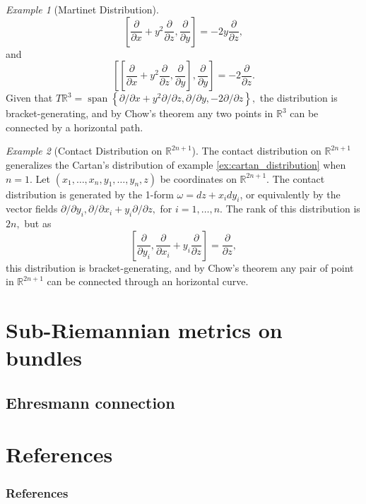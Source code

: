 \documentclass [xcolor=svgnames, t] {beamer}
\theoremstyle{definition}
\theoremstyle{plain}
\theoremstyle{remark}
\newtheorem{ex}{Example}
\begin{document}
\begin{frame}
\begin{ex}[Martinet Distribution]
	$$ \left[ \frac{\partial }{\partial x} + y^2 \frac{\partial }{\partial z} , \frac{\partial }{\partial y}  \right] =-2y \frac{\partial }{\partial z}, $$ 
	and 
	$$ \left[\left[ \frac{\partial }{\partial x} + y^2 \frac{\partial }{\partial z} , \frac{\partial }{\partial y}  \right], \frac{\partial }{\partial y} \right] = -2 \frac{\partial }{\partial z}.  $$ 
	Given that $ T \mathbb{R}^3 = \operatorname{span} \left\{ \partial/\partial x+ y^2\partial/\partial z, \partial/\partial y, -2\partial/\partial z \right\},  $ the distribution is bracket-generating, and by Chow's theorem any two points in $ \mathbb{R}^3 $ can be connected by a horizontal path. 
\end{ex}
\begin{ex}[Contact Distribution on $ \mathbb{R}^{2n+1} $]
	The contact distribution on $ \mathbb{R}^{2n+1} $ generalizes the Cartan's distribution of example \ref{ex:cartan_distribution} when $ n=1 $. Let $ (x_1,\dots,x_n,y_1,\dots, y_n,z) $ be coordinates on $ \mathbb{R}^{2n+1} $. The contact distribution is generated by the 1-form $ \omega = dz+ x_i dy_i$, or equivalently by the vector fields $ \partial/ \partial y_i, \partial/ \partial x_i+ y_i \partial/\partial z, $ for $ i=1,\dots, n. $ The rank of this distribution is $ 2n, $ but as 
	$$ \left[ \frac{\partial }{\partial y_i} , \frac{\partial }{\partial x_i} + y_i \frac{\partial }{\partial z}  \right] = \frac{\partial }{\partial z},  $$ 
	this distribution is bracket-generating, and by Chow's theorem any pair of point in $ \mathbb{R}^{2n+1} $ can be connected through an horizontal curve.
\end{ex}
\end{frame}
\section{Sub-Riemannian metrics on bundles}
\subsection{Ehresmann connection}%
\label{sub:ehresmann_connection}


\section{References}
\begin{frame} [allowframebreaks]\frametitle{References}
        
	\nocite{*}
        
\end{frame}
\end{document}
